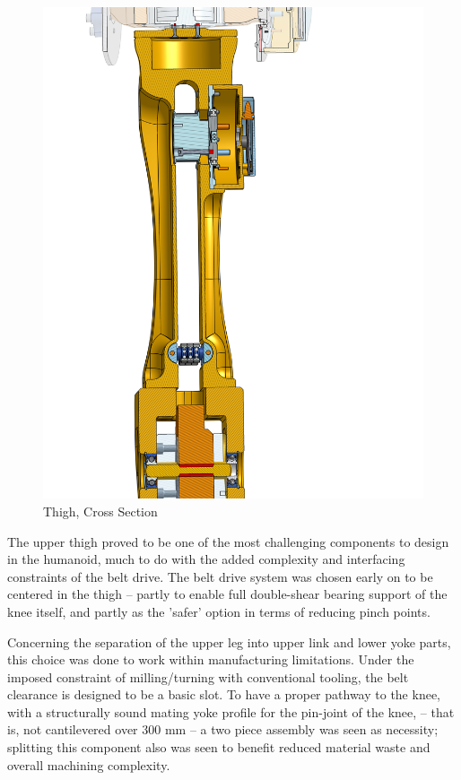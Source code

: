 \documentclass{article}
\begin{document}
\begin{figure}
    \centering
    \includegraphics[width=0.75\linewidth]{assets/MOHRA/Sub-Leg/LegAssem_ThighXS.png}
    \caption{Thigh, Cross Section}
    \label{fig:enter-label}
\end{figure}

The upper thigh proved to be one of the most challenging components to design in the humanoid, much to do with the added complexity and interfacing constraints of the belt drive. The belt drive system was chosen early on to be centered in the thigh -- partly to enable full double-shear bearing support of the knee itself, and partly as the 'safer' option in terms of reducing pinch points. 

Concerning the separation of the upper leg into upper link and lower yoke parts, this choice was done to work within manufacturing limitations. Under the imposed constraint of milling/turning with conventional tooling, the belt clearance is designed to be a basic slot. To have a proper pathway to the knee, with a structurally sound mating yoke profile for the pin-joint of the knee, -- that is, not cantilevered over 300 mm -- a two piece assembly was seen as necessity; splitting this component also was seen to benefit reduced material waste and overall machining complexity. 
\end{document}
